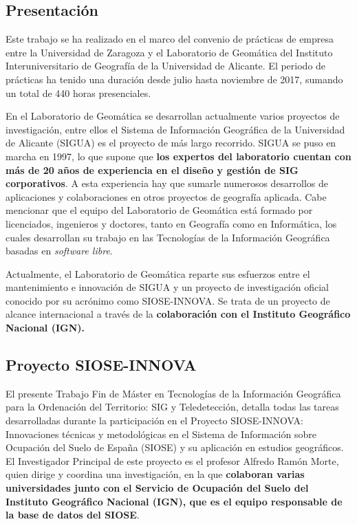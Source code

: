 
\begin{prologo}

\subsection*{Presentación}
Este trabajo se ha realizado en el marco del convenio de prácticas de empresa entre la Universidad de Zaragoza y el Laboratorio de Geomática del Instituto Interuniversitario de Geografía de la Universidad de Alicante. El periodo de prácticas ha tenido una duración desde julio hasta noviembre de 2017, sumando un total de 440 horas presenciales.

En el Laboratorio de Geomática se desarrollan actualmente varios proyectos de investigación, entre ellos el Sistema de Información Geográfica de la Universidad de Alicante (SIGUA) es el proyecto de más largo recorrido. SIGUA se puso en marcha en 1997, lo que supone que \textbf{los expertos del laboratorio cuentan con más de 20 años de experiencia en el diseño y gestión de SIG corporativos}. A esta experiencia hay que sumarle numerosos desarrollos de aplicaciones y colaboraciones en otros proyectos de geografía aplicada. Cabe mencionar que el equipo del Laboratorio de Geomática está formado por licenciados, ingenieros y doctores, tanto en Geografía como en Informática, los cuales desarrollan su trabajo en las Tecnologías de la Información Geográfica basadas en \textit{software libre}.

Actualmente, el Laboratorio de Geomática reparte sus esfuerzos entre el mantenimiento e innovación de SIGUA y un proyecto de investigación oficial conocido por su acrónimo como SIOSE-INNOVA. Se trata de un proyecto de alcance internacional a través de la \textbf{colaboración con el Instituto Geográfico Nacional (IGN).}

\subsection*{Proyecto SIOSE-INNOVA}
El presente Trabajo Fin de Máster en Tecnologías de la Información Geográfica para la Ordenación del Territorio: SIG y Teledetección, detalla todas las tareas desarrolladas durante la participación en el Proyecto SIOSE-INNOVA: Innovaciones técnicas y metodológicas en el Sistema de Información sobre Ocupación del Suelo de España (SIOSE) y su aplicación en estudios geográficos. El Investigador Principal de este proyecto es el profesor Alfredo Ramón Morte, quien dirige y coordina una investigación, en la que \textbf{colaboran varias universidades junto con el  Servicio de Ocupación del Suelo del Instituto Geográfico Nacional (IGN), que es el equipo responsable de la base de datos del SIOSE}.


\end{prologo}
